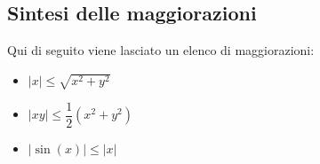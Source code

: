 \documentclass[a4paper]{article}
\begin{document}
	\newpage
	
	\subsection{Sintesi delle maggiorazioni}
	
	Qui di seguito viene lasciato un elenco di maggiorazioni:
	
	\begin{itemize}
		\item $|x| \le \sqrt{x^{2} + y^{2}}$
		\item $|xy| \le \dfrac{1}{2}\left(x^{2} + y^{2}\right)$
		\item $|\sin \left(x\right)| \le |x|$
	\end{itemize}

	\newpage
	
	\
\end{document}
